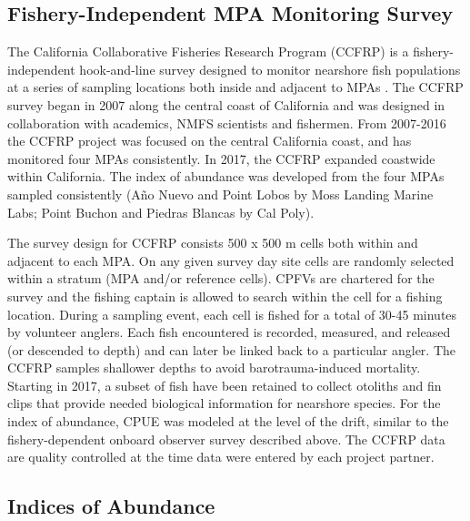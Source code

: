 \documentclass[
  12pt,
  authoryear,
  preprint,
  3p]{elsarticle}
\begin{document}
\hypertarget{fishery-independent-mpa-monitoring-survey}{%
\subsection{Fishery-Independent MPA Monitoring
Survey}\label{fishery-independent-mpa-monitoring-survey}}

The California Collaborative Fisheries Research Program (CCFRP) is a
fishery-independent hook-and-line survey designed to monitor nearshore
fish populations at a series of sampling locations both inside and
adjacent to MPAs
\citep{starr_variation_2015a, wendt_collaborative_2009}. The CCFRP
survey began in 2007 along the central coast of California and was
designed in collaboration with academics, NMFS scientists and fishermen.
From 2007-2016 the CCFRP project was focused on the central California
coast, and has monitored four MPAs consistently. In 2017, the CCFRP
expanded coastwide within California. The index of abundance was
developed from the four MPAs sampled consistently (Año Nuevo and Point
Lobos by Moss Landing Marine Labs; Point Buchon and Piedras Blancas by
Cal Poly).

The survey design for CCFRP consists 500 x 500 m cells both within and
adjacent to each MPA. On any given survey day site cells are randomly
selected within a stratum (MPA and/or reference cells). CPFVs are
chartered for the survey and the fishing captain is allowed to search
within the cell for a fishing location. During a sampling event, each
cell is fished for a total of 30-45 minutes by volunteer anglers. Each
fish encountered is recorded, measured, and released (or descended to
depth) and can later be linked back to a particular angler. The CCFRP
samples shallower depths to avoid barotrauma-induced mortality. Starting
in 2017, a subset of fish have been retained to collect otoliths and fin
clips that provide needed biological information for nearshore species.
For the index of abundance, CPUE was modeled at the level of the drift,
similar to the fishery-dependent onboard observer survey described
above. The CCFRP data are quality controlled at the time data were
entered by each project partner.

\hypertarget{indices-of-abundance}{%
\subsection{Indices of Abundance}\label{indices-of-abundance}}
\end{document}
